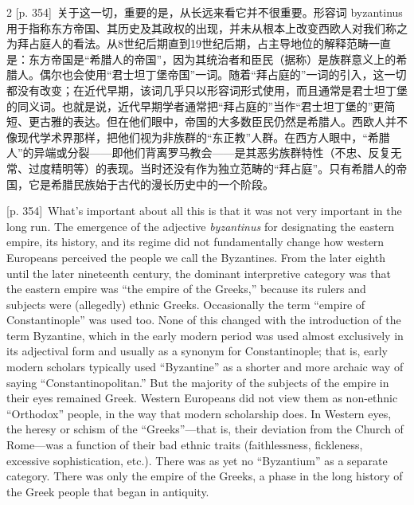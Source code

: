 \documentclass[10pt,a4paper]{article}
\begin{document}
\begin{paracol}{2}
{\scriptsize\color{gray}[p. 354]}\ 关于这一切，重要的是，从长远来看它并不很重要。形容词 byzantinus 用于指称东方帝国、其历史及其政权的出现，并未从根本上改变西欧人对我们称之为拜占庭人的看法。从8世纪后期直到19世纪后期，占主导地位的解释范畴一直是：东方帝国是“希腊人的帝国”，因为其统治者和臣民（据称）是族群意义上的希腊人。偶尔也会使用“君士坦丁堡帝国”一词。随着“拜占庭的”一词的引入，这一切都没有改变；在近代早期，该词几乎只以形容词形式使用，而且通常是君士坦丁堡的同义词。也就是说，近代早期学者通常把“拜占庭的”当作“君士坦丁堡的”更简短、更古雅的表达。但在他们眼中，帝国的大多数臣民仍然是希腊人。西欧人并不像现代学术界那样，把他们视为非族群的“东正教”人群。在西方人眼中，“希腊人”的异端或分裂——即他们背离罗马教会——是其恶劣族群特性（不忠、反复无常、过度精明等）的表现。当时还没有作为独立范畴的“拜占庭”。只有希腊人的帝国，它是希腊民族始于古代的漫长历史中的一个阶段。\par
\switchcolumn
{\scriptsize\color{gray}[p. 354]}\ What’s important about all this is that it was not very important in the long run. The emergence of the adjective \textit{byzantinus} for designating the eastern empire, its history, and its regime did not fundamentally change how western Europeans perceived the people we call the Byzantines. From the later eighth until the later nineteenth century, the dominant interpretive category was that the eastern empire was “the empire of the Greeks,” because its rulers and subjects were (allegedly) ethnic Greeks. Occasionally the term “empire of Constantinople” was used too. None of this changed with the introduction of the term Byzantine, which in the early modern period was used almost exclusively in its adjectival form and usually as a synonym for Constantinople; that is, early modern scholars typically used “Byzantine” as a shorter and more archaic way of saying “Constantinopolitan.” But the majority of the subjects of the empire in their eyes remained Greek. Western Europeans did not view them as non-ethnic “Orthodox” people, in the way that modern scholarship does. In Western eyes, the heresy or schism of the “Greeks”—that is, their deviation from the Church of Rome—was a function of their bad ethnic traits (faithlessness, fickleness, excessive sophistication, etc.). There was as yet no “Byzantium” as a separate category. There was only the empire of the Greeks, a phase in the long history of the Greek people that began in antiquity.\par
\switchcolumn*

\end{paracol}
\end{document}
